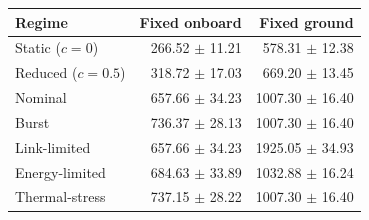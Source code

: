 \begin{tabular}{lrr}
\toprule
Regime & Fixed onboard & Fixed ground \\
\midrule
Static ($c=0$) & 266.52 $\pm$ 11.21 & 578.31 $\pm$ 12.38 \\
Reduced ($c=0.5$) & 318.72 $\pm$ 17.03 & 669.20 $\pm$ 13.45 \\
Nominal & 657.66 $\pm$ 34.23 & 1007.30 $\pm$ 16.40 \\
Burst & 736.37 $\pm$ 28.13 & 1007.30 $\pm$ 16.40 \\
Link-limited & 657.66 $\pm$ 34.23 & 1925.05 $\pm$ 34.93 \\
Energy-limited & 684.63 $\pm$ 33.89 & 1032.88 $\pm$ 16.24 \\
Thermal-stress & 737.15 $\pm$ 28.22 & 1007.30 $\pm$ 16.40 \\
\bottomrule
\end{tabular}